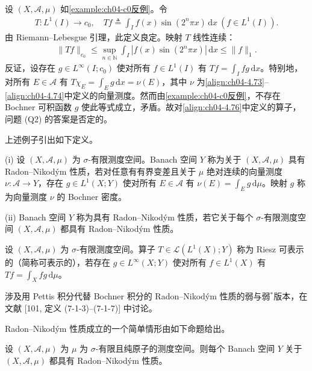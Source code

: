 \documentclass[../../main.tex]{subfiles}%
\begin{document}
\begin{example}\label{example:ch04-算子反例}
设 $(X,\mathcal{A},\mu)$ 如\cref{example:ch04-c0反例}。令
\begin{align}
T:L^1(I)\to c_0,\quad Tf\triangleq \int_I f(x)\sin(2^n\pi x)\,\mathrm{d}x\ (f\in L^1(I)). \label{align:ch04-4.76}
\end{align}
由 Riemann--Lebesgue 引理，此定义良定。映射 $T$ 线性连续：
\begin{align*}
\|Tf\|_{c_0}\leqslant\sup_{n\in\mathbb{N}}\int_I|f(x)\sin(2^n\pi x)|\,\mathrm{d}x\leqslant\|f\|_1.
\end{align*}
反证，设存在 $g\in L^\infty(I;c_0)$ 使对所有 $f\in L^1(I)$ 有 $Tf=\int_I fg\,\mathrm{d}x$。特别地，对所有 $E\in\mathcal{A}$ 有 $T\chi_E=\int_E g\,\mathrm{d}x=\nu(E)$，其中 $\nu$ 为\eqref{align:ch04-4.73}--\eqref{align:ch04-4.74}中定义的向量测度。然而由\cref{example:ch04-c0反例}，不存在 Bochner 可积函数 $g$ 使此等式成立，矛盾。故对\eqref{align:ch04-4.76}中定义的算子，问题 (Q2) 的答案是否定的。
\end{example}

上述例子引出如下定义。

\begin{definition}\label{definition:ch04-RNP}
(i) 设 $(X,\mathcal{A},\mu)$ 为 $\sigma$-有限测度空间。Banach 空间 $Y$ 称为关于 $(X,\mathcal{A},\mu)$ 具有 Radon--Nikodým 性质，若对任意有有界变差且关于 $\mu$ 绝对连续的向量测度 $\nu:\mathcal{A}\to Y$，存在 $g\in L^1(X;Y)$ 使对所有 $E\in\mathcal{A}$ 有 $\nu(E)=\int_E g\,\mathrm{d}\mu$。映射 $g$ 称为向量测度 $\nu$ 的 Bochner 密度。

(ii) Banach 空间 $Y$ 称为具有 Radon--Nikodým 性质，若它关于每个 $\sigma$-有限测度空间 $(X,\mathcal{A},\mu)$ 都具有 Radon--Nikodým 性质。
\end{definition}

\begin{definition}\label{definition:ch04-Riesz可表示}
设 $(X,\mathcal{A},\mu)$ 为 $\sigma$-有限测度空间。算子 $T\in\mathcal{L}(L^1(X);Y)$ 称为 Riesz 可表示的（简称可表示的），若存在 $g\in L^\infty(X;Y)$ 使对所有 $f\in L^1(X)$ 有 $Tf=\int_X fg\,\mathrm{d}\mu$。
\end{definition}

涉及用 Pettis 积分代替 Bochner 积分的 Radon--Nikodým 性质的弱与弱$^*$版本，在文献 [101, 定义 (7-1-3)--(7-1-7)] 中讨论。

Radon--Nikodým 性质成立的一个简单情形由如下命题给出。

\begin{proposition}\label{proposition:ch04-纯原子RNP}
设 $(X,\mathcal{A},\mu)$ 为 $\mu$ 为 $\sigma$-有限且纯原子的测度空间。则每个 Banach 空间 $Y$ 关于 $(X,\mathcal{A},\mu)$ 都具有 Radon--Nikodým 性质。
\end{proposition}
\end{document}
